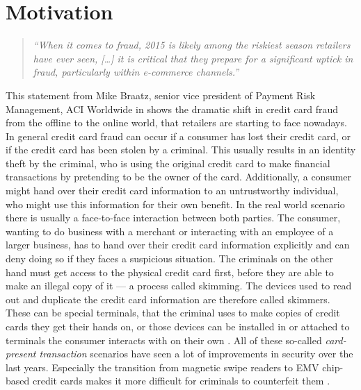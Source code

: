 
\section{Motivation}
\label{sec:motivation}

\begin{quotation}
    \textit{\enquote{When it comes to fraud, 2015 is likely among the riskiest season retailers have ever seen, […]
    it is critical that they prepare for a significant uptick in fraud, particularly within e-commerce channels.} \citep{Reuters2015}}
\end{quotation}

This statement from Mike Braatz, senior vice president of Payment Risk Management, ACI Worldwide in \citep{Reuters2015} shows the dramatic shift in credit card fraud from the offline to the online world, that retailers are starting to face nowadays. \\

In general credit card fraud can occur if a consumer has lost their credit card, or if the credit card has been stolen by a criminal. This usually results in an identity theft by the criminal, who is using the original credit card to make financial transactions by pretending to be the owner of the card. Additionally, a consumer might hand over their credit card information to an untrustworthy individual, who might use this information for their own benefit. In the real world scenario there is usually a face-to-face interaction between both parties. The consumer, wanting to do business with a merchant or interacting with an employee of a larger business, has to hand over their credit card information explicitly and can deny doing so if they faces a suspicious situation. The criminals on the other hand must get access to the physical credit card first, before they are able to make an illegal copy of it --- a process called skimming. The devices used to read out and duplicate the credit card information are therefore called skimmers. These can be special terminals, that the criminal uses to make copies of credit cards they get their hands on, or those devices can be installed in or attached to terminals the consumer interacts with on their own \citep{ConsumerAction2009}. All of these so-called \textit{card-present transaction} scenarios have seen a lot of improvements in security over the last years. Especially the transition from magnetic swipe readers to EMV chip-based credit cards makes it more difficult for criminals to counterfeit them \citep{Lewis2015}. \\

